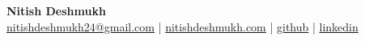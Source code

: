 \begin{center}
    \Huge \textbf{Nitish Deshmukh} \\[3pt]
    \normalsize
        \href{mailto:nitishdeshmukh24@gmail.com}{nitishdeshmukh24@gmail.com} |
        \href{https://nitishdeshmukh.com}{nitishdeshmukh.com} |
        \href{https://github.com/nitishdeshmukh}{github} |
        \href{https://www.linkedin.com/in/nitish-deshmukh/}{linkedin}
\end{center}
